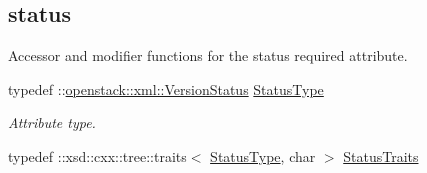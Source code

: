 \subsection*{status}
\label{_amgrp9acb44549b41563697bb490144ec6258}
Accessor and modifier functions for the status required attribute. \begin{DoxyCompactItemize}
\item 
\hypertarget{classopenstack_1_1xml_1_1Version_a7832c024b9161d3a173170af758d7d3f}{
typedef ::\hyperlink{classopenstack_1_1xml_1_1VersionStatus}{openstack::xml::VersionStatus} \hyperlink{classopenstack_1_1xml_1_1Version_a7832c024b9161d3a173170af758d7d3f}{StatusType}}
\label{classopenstack_1_1xml_1_1Version_a7832c024b9161d3a173170af758d7d3f}

\begin{DoxyCompactList}\small\item\em Attribute type. \item\end{DoxyCompactList}\item 
\hypertarget{classopenstack_1_1xml_1_1Version_a9468d8b3445c1724bc3ca732a790db22}{
typedef ::xsd::cxx::tree::traits$<$ \hyperlink{classopenstack_1_1xml_1_1VersionStatus}{StatusType}, char $>$ \hyperlink{classopenstack_1_1xml_1_1Version_a9468d8b3445c1724bc3ca732a790db22}{StatusTraits}}
\label{classopenstack_1_1xml_1_1Version_a9468d8b3445c1724bc3ca732a790db22}


\end{DoxyCompactItemize}

